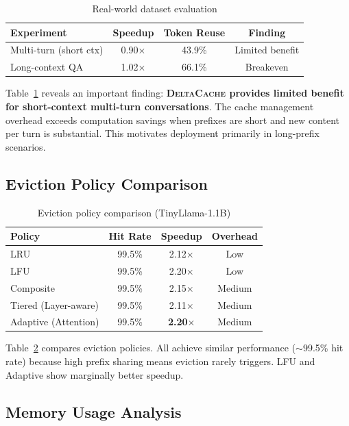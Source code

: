 \documentclass{article}
\newcommand{\deltacache}{\textsc{DeltaCache}}
\begin{document}
\begin{table}[t]
\centering
\caption{Real-world dataset evaluation}
\label{tab:sharegpt}
\small
\begin{tabular}{lccc}
\toprule
Experiment & Speedup & Token Reuse & Finding \\
\midrule
Multi-turn (short ctx) & 0.90$\times$ & 43.9\% & Limited benefit \\
Long-context QA & 1.02$\times$ & 66.1\% & Breakeven \\
\bottomrule
\end{tabular}
\end{table}

Table~\ref{tab:sharegpt} reveals an important finding: \textbf{\deltacache{} provides limited benefit for short-context multi-turn conversations}.
The cache management overhead exceeds computation savings when prefixes are short and new content per turn is substantial.
This motivates deployment primarily in long-prefix scenarios.

\subsection{Eviction Policy Comparison}

\begin{table}[t]
\centering
\caption{Eviction policy comparison (TinyLlama-1.1B)}
\label{tab:eviction}
\small
\begin{tabular}{lccc}
\toprule
Policy & Hit Rate & Speedup & Overhead \\
\midrule
LRU & 99.5\% & 2.12$\times$ & Low \\
LFU & 99.5\% & 2.20$\times$ & Low \\
Composite & 99.5\% & 2.15$\times$ & Medium \\
Tiered (Layer-aware) & 99.5\% & 2.11$\times$ & Medium \\
Adaptive (Attention) & 99.5\% & \textbf{2.20$\times$} & Medium \\
\bottomrule
\end{tabular}
\end{table}

Table~\ref{tab:eviction} compares eviction policies.
All achieve similar performance ($\sim$99.5\% hit rate) because high prefix sharing means eviction rarely triggers.
LFU and Adaptive show marginally better speedup.

\subsection{Memory Usage Analysis}
\end{document}
